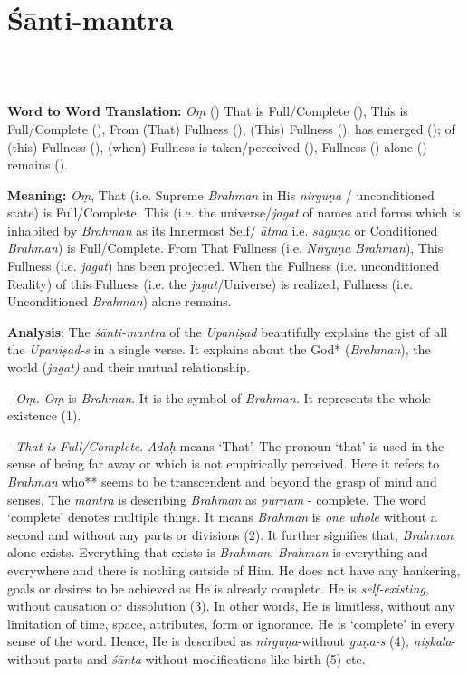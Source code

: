 \chapter{Śānti-mantra}

\begin{moolashloka}
\\
\\
\end{moolashloka}
\vskip -10pt

\textbf{Word to Word Translation:} \emph{Oṃ} () That is Full/Complete (), This is Full/Complete (), From (That) Fullness (), (This) Fullness (), has emerged (); of (this) Fullness (), (when) Fullness is taken/perceived (), Fullness () alone () remains ().

\textbf{Meaning:} \emph{Oṃ}, That (i.e. Supreme \emph{Brahman} in His \emph{nirguṇa} / unconditioned state) is Full/Complete. This (i.e. the universe/\emph{jagat} of names and forms which is inhabited by \emph{Brahman} as its Innermost Self/ \emph{ātma} i.e. \emph{saguṇa} or Conditioned \emph{Brahman}) is Full/Complete. From That Fullness (i.e. \emph{Nirguṇa} \emph{Brahman}), This Fullness (i.e. \emph{jagat}) has been projected. When the Fullness (i.e. unconditioned Reality) of this Fullness (i.e. the \emph{jagat}/Universe) is realized, Fullness (i.e. Unconditioned \emph{Brahman}) alone remains.

\textbf{Analysis}: The \emph{śānti-mantra} of the \emph{Upaniṣad} beautifully explains the gist of all the \emph{Upaniṣad-s} in a single verse. It explains about the God* (\emph{Brahman}), the world (\emph{jagat)} and their mutual relationship.

- \emph{Oṃ.} \emph{Oṃ} is \emph{Brahman}. It is the symbol of \emph{Brahman}. It represents the whole existence (1).

- \emph{That is Full/Complete}. \emph{Adaḥ} means `That'. The pronoun `that' is used in the sense of being far away or which is not empirically perceived. Here it refers to \emph{Brahman} who** seems to be transcendent and beyond the grasp of mind and senses. The \emph{mantra} is describing \emph{Brahman} as \emph{pūrṇam} - complete. The word `complete' denotes multiple things. It means \emph{Brahman} is \emph{one whole} without a second and without any parts or divisions (2). It further signifies that, \emph{Brahman} alone exists. Everything that exists is \emph{Brahman}. \emph{Brahman} is everything and everywhere and there is nothing outside of Him. He does not have any hankering, goals or desires to be achieved as He is already complete. He is \emph{self-existing}, without causation or dissolution (3). In other words, He is limitless, without any limitation of time, space, attributes, form or ignorance. He is `complete' in every sense of the word. Hence, He is described as \emph{nirguṇa}-without \emph{guṇa-s} (4), \emph{niṣkala}-without parts and \emph{śānta}-without modifications like birth (5) etc.

